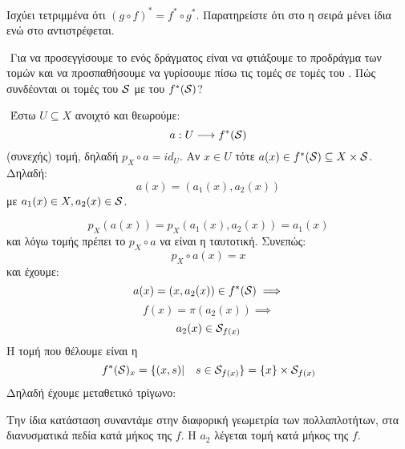 \begin{figure}[H]
    \centering
\end{figure}

\noindent Ισχύει τετριμμένα ότι $(g \circ f)^* = f^* \circ g^*$. Παρατηρείστε ότι στο  η σειρά μένει ίδια ενώ στο  αντιστρέφεται.

$ $\newline
Για να προσεγγίσουμε το  ενός δράγματος είναι να φτιάξουμε το προδράγμα των τομών και να προσπαθήσουμε να γυρίσουμε πίσω τις τομές σε τομές του . Πώς συνδέονται οι τομές του $\mathcal{S}$ με του $f^*(\mathcal{S})$?

$ $\newline
Έστω $U \subseteq X$ ανοιχτό και θεωρούμε:
$$a: U \longrightarrow f^*(\mathcal{S})$$ (συνεχής) τομή, δηλαδή $p_X \circ a = id_U$. Αν $x \in U$ τότε $a(x) \in f^*(\mathcal{S}) \subseteq X \times \mathcal{S}$. Δηλαδή:
$$a(x) = (a_1(x), a_2(x))$$ με $a_1(x) \in X, a_2(x) \in \mathcal{S}$.

$$p_X(a(x)) = p_X (a_1(x),a_2(x)) = a_1(x)$$ και λόγω τομής πρέπει το $p_X \circ a$ να είναι η ταυτοτική. Συνεπώς:
$$p_X \circ a(x) = x$$ και έχουμε:
$$a(x) = (x, a_2(x)) \in f^*(\mathcal{S}) \implies $$
$$f(x) = \pi (a_2(x)) \implies $$
$$a_2(x) \in \mathcal{S}_{f(x)}$$ Η τομή που θέλουμε είναι η
$$f^*(\mathcal{S})_x = \{(x,s)| \quad s \in \mathcal{S}_{f(x)}\} = \{x\} \times \mathcal{S}_{f(x)}$$ Δηλαδή έχουμε μεταθετικό τρίγωνο:

\begin{figure}[H]
    \centering
\end{figure}

\noindent
Την ίδια κατάσταση συναντάμε στην διαφορική γεωμετρία των πολλαπλοτήτων, στα διανυσματικά πεδία κατά μήκος της $f$. Η $a_2$ λέγεται τομή κατά μήκος της $f$.
